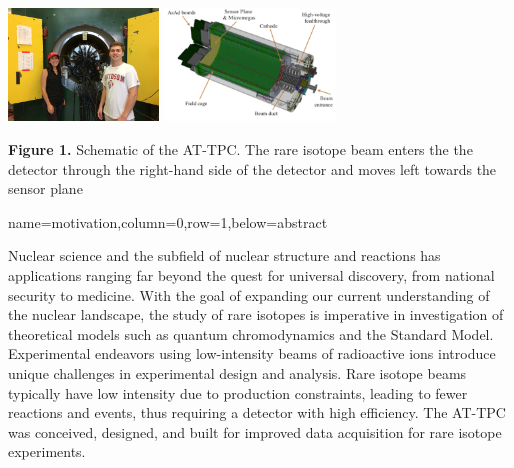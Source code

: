 \documentclass[a0paper,portrait]{baposter}
\begin{document}
\begin{poster}
{\begin{center}
\includegraphics [height=30mm]{michigan_trip.jpg} %
\hspace{0.2cm}
\includegraphics [height=30mm] {attpc.png}
\end{center}

\small{\textbf{Figure 1.} Schematic of the AT-TPC. The rare isotope beam enters the the detector through the right-hand side of the detector and moves left towards the sensor plane}

}
{name=motivation,column=0,row=1,below=abstract}
{\small{Nuclear science and the subfield of nuclear structure and reactions has applications ranging far beyond the quest for universal discovery, from national security to medicine. With the goal of expanding our current understanding of the nuclear landscape, the study of rare isotopes is imperative in investigation of theoretical models such as quantum chromodynamics and the Standard Model. Experimental endeavors using low-intensity beams of radioactive ions introduce unique challenges in experimental design and analysis. Rare isotope beams typically have low intensity due to production constraints, leading to fewer reactions and events, thus requiring a detector with high efficiency. The AT-TPC was conceived, designed, and built for improved data acquisition for rare isotope experiments. 

}}
\end{poster}
\end{document}
